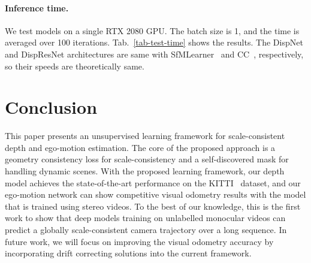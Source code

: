 \documentclass{article}
\newcommand{\tabref}[1]{Tab.~\ref{#1}}
\begin{document}
\begin{table}[ht]
    \centering
    \caption{Training time per iteration and model parameters for each network.}
    \label{tab-tim}
\end{table}


\paragraph{Inference time.}
We test models on a single RTX 2080 GPU.
The batch size is 1, and the time is averaged over 100 iterations.
\tabref{tab-test-time} shows the results.
The DispNet and DispResNet architectures are same with SfMLearner~\cite{zhou2017unsupervised} and CC~\cite{ranjan2019cc}, respectively,
so their speeds are theoretically same.

\begin{table}[!ht]
    \centering
    \caption{Inference time on per image or image pair.}
    \label{tab-test-time}
     \vspace{-2mm}
\end{table}



\section{Conclusion}
This paper presents an unsupervised learning framework for scale-consistent depth and ego-motion estimation.
The core of the proposed approach is a geometry consistency loss for scale-consistency and a self-discovered mask for handling dynamic scenes.
With the proposed learning framework, our depth model achieves the state-of-the-art performance on the KITTI~\cite{Geiger2013IJRR} dataset,
and our ego-motion network can show competitive visual odometry results with the model that is trained using stereo videos.
To the best of our knowledge, this is the first work to show that deep models training on unlabelled monocular videos can predict a globally scale-consistent camera trajectory over a long sequence.
In future work, we will focus on improving the visual odometry accuracy by incorporating drift correcting solutions into the current framework.
\end{document}
